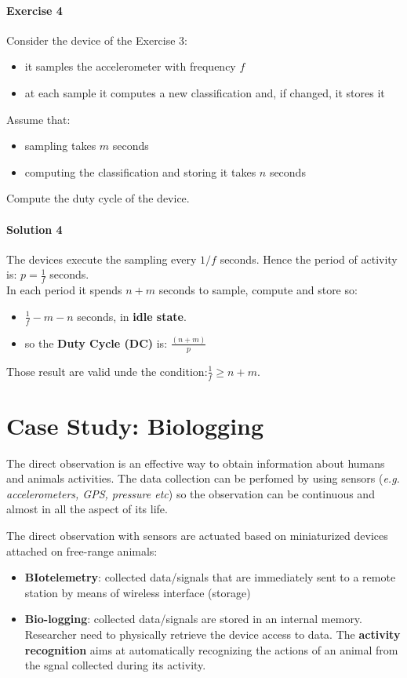 \documentclass[10pt,a4paper]{report}
\theoremstyle{definition}
\begin{document}
\subsubsection{Exercise 4}\label{sec:exercise-4}
Consider the device of the Exercise 3:
\begin{itemize}
	\item 
	it samples the accelerometer with frequency $f$
	\item 
	at each sample it computes a new classification and, if changed, it stores it
\end{itemize}
Assume that:
\begin{itemize}
	
	\item 
	sampling takes $m$ seconds
	\item 
	computing the classification and storing it takes $n$ seconds
	
\end{itemize}
Compute the duty cycle of the device.
\subsubsection{Solution 4}\label{sec:solution-4}
The devices execute the sampling every $1/f$ seconds. Hence the period of activity is: $p = \frac{1}{f}$ seconds.\\
In each period it spends $n+m$ seconds to sample, compute and store so:
\begin{itemize}
	\item 
	$\frac{1}{f} - m -n$ seconds, in \textbf{idle state}.
	\item so the \textbf{Duty Cycle (DC)} is: $\frac{(n+m)}{p}$
\end{itemize}

Those result are valid unde the condition:$\frac{1}{f} \geq n+m$.



\chapter{Case Study: Biologging}\label{sec:case-study-biologging}
The direct observation is an effective way to obtain information about humans and animals activities. The data collection can be perfomed by using sensors (\textit{e.g. accelerometers, GPS, pressure etc}) so the observation can be continuous and almost in all the aspect of its life.

The direct observation with sensors are actuated based on miniaturized devices attached on free-range animals:
\begin{itemize}
	\item 
	\textbf{BIotelemetry}: collected data/signals that are immediately sent to a remote station by means of wireless interface (storage)
	\item 
	\textbf{Bio-logging}: collected data/signals are stored in an internal memory. Researcher need to physically retrieve the device access to data.
	The \textbf{activity recognition} aims at automatically recognizing the actions of an animal from the sgnal collected during its activity.
\end{itemize}
\end{document}

